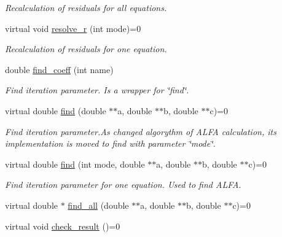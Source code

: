 \begin{DoxyCompactItemize}
\begin{DoxyCompactList}\small\item\em Recalculation of residuals for all equations. \end{DoxyCompactList}\item 
virtual void \hyperlink{classAlg_aa2436420b85976a48465408e9d86d425}{resolve\_\-r} (int mode)=0
\begin{DoxyCompactList}\small\item\em Recalculation of residuals for one equation. \end{DoxyCompactList}\item 
double \hyperlink{classAlg_abac775cccf3e4811358a05048a5300b2}{find\_\-coeff} (int name)
\begin{DoxyCompactList}\small\item\em Find iteration parameter. Is a wrapper for \char`\"{}find\char`\"{}. \end{DoxyCompactList}\item 
virtual double \hyperlink{classAlg_ada4ff3d2a0adb3b177d824e337158bfd}{find} (double $\ast$$\ast$a, double $\ast$$\ast$b, double $\ast$$\ast$c)=0
\begin{DoxyCompactList}\small\item\em Find iteration parameter.As changed algorythm of ALFA calculation, its implementation is moved to find with parameter \char`\"{}mode\char`\"{}. \end{DoxyCompactList}\item 
virtual double \hyperlink{classAlg_a979d6df06027c6353b682662d8c514fc}{find} (int mode, double $\ast$$\ast$a, double $\ast$$\ast$b, double $\ast$$\ast$c)=0
\begin{DoxyCompactList}\small\item\em Find iteration parameter for one equation. Used to find ALFA. \end{DoxyCompactList}\item 
virtual double $\ast$ \hyperlink{classAlg_aef9cdfe539aed53c23222715c551e11e}{find\_\-all} (double $\ast$$\ast$a, double $\ast$$\ast$b, double $\ast$$\ast$c)=0
\item 
\hypertarget{classAlg_a15c167548bbe12a4e021bfbb618faab0}{
virtual void \hyperlink{classAlg_a15c167548bbe12a4e021bfbb618faab0}{check\_\-result} ()=0}
\label{classAlg_a15c167548bbe12a4e021bfbb618faab0}


\end{DoxyCompactItemize}
